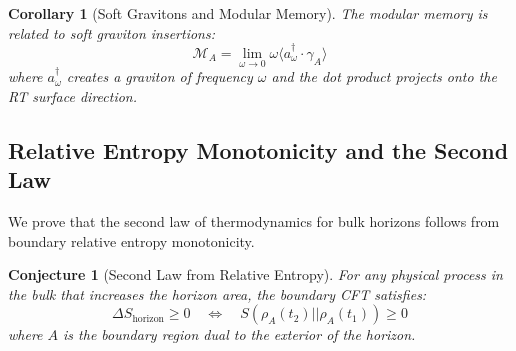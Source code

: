 \documentclass[12pt,a4paper]{article}
\newtheorem{conjecture}[theorem]{Conjecture}
\newtheorem{corollary}[theorem]{Corollary}
\begin{document}
\begin{corollary}[Soft Gravitons and Modular Memory]
The modular memory is related to soft graviton insertions:
\begin{equation}
\mathcal{M}_A = \lim_{\omega \to 0} \omega \langle a^\dagger_\omega \cdot \gamma_A \rangle
\end{equation}
where $a^\dagger_\omega$ creates a graviton of frequency $\omega$ and the dot product projects onto the RT surface direction.
\end{corollary}

\subsection{Relative Entropy Monotonicity and the Second Law}

We prove that the second law of thermodynamics for bulk horizons follows from boundary relative entropy monotonicity.

\begin{conjecture}[Second Law from Relative Entropy]
For any physical process in the bulk that increases the horizon area, the boundary CFT satisfies:
\begin{equation}
\Delta S_{\text{horizon}} \geq 0 \quad \Leftrightarrow \quad S(\rho_{A}(t_2) || \rho_{A}(t_1)) \geq 0
\end{equation}
where $A$ is the boundary region dual to the exterior of the horizon.
\end{conjecture}
\end{document}

